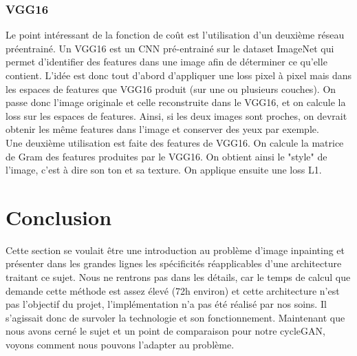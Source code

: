 \subsubsection{VGG16}
Le point intéressant de la fonction de coût est l'utilisation d'un deuxième réseau préentrainé. Un VGG16 est un CNN pré-entrainé sur le dataset ImageNet qui permet d'identifier des features dans une image afin de déterminer ce qu'elle contient. L'idée est donc tout d'abord d'appliquer une loss pixel à pixel mais dans les espaces de features que VGG16 produit (sur une ou plusieurs couches). On passe donc l'image originale et celle reconstruite dans le VGG16, et on calcule la loss sur les espaces de features. Ainsi, si les deux images sont proches, on devrait obtenir les même features dans l'image et conserver des yeux par exemple. \\
Une deuxième utilisation est faite des features de VGG16. On calcule la matrice de Gram des features produites par le VGG16. On obtient ainsi le "style" de l'image, c'est à dire son ton et sa texture. On applique ensuite une loss L1.

\section{Conclusion}
Cette section se voulait être une introduction au problème d'image inpainting et présenter dans les grandes lignes les spécificités réapplicables d'une architecture traitant ce sujet. Nous ne rentrons pas dans les détails, car le temps de calcul que demande cette méthode est assez élevé (72h environ) et cette architecture n'est pas l'objectif du projet, l'implémentation n'a pas été réalisé par nos soins. Il s'agissait donc de survoler la technologie et son fonctionnement. Maintenant que nous avons cerné le sujet et un point de comparaison pour notre cycleGAN, voyons comment nous pouvons l'adapter au problème.

